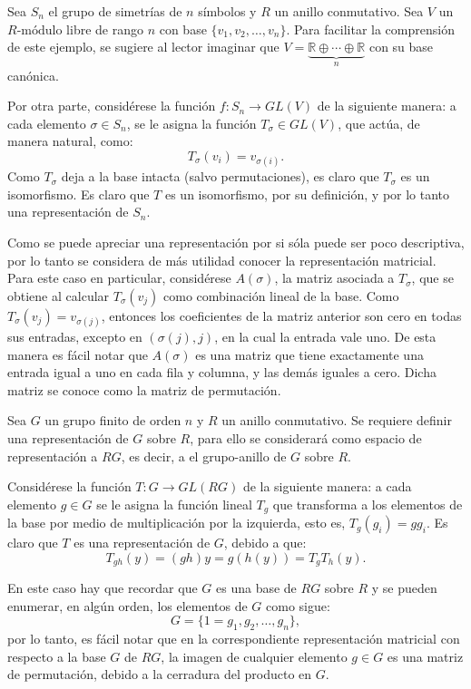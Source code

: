 \begin{ejemplo}
Sea $S_n$ el grupo de simetrías de $n$ símbolos y $R$ un anillo conmutativo. Sea $V$ un $R\mbox{-módulo}$ libre de rango $n$ con base $\{v_1, v_2, \dots, v_n\}$. Para facilitar la comprensión de este ejemplo, se sugiere al lector imaginar que $V = \underset{n}{\underbrace{\mathds{R} \oplus \cdots \oplus \mathds{R}}}$ con su base canónica. 

Por otra parte, considérese la función $f \colon S_n \to GL(V)$ de la siguiente manera: a cada elemento $\sigma 
\in S_n$, se le asigna la función $T_{\sigma} \in GL(V)$, que actúa, de manera natural, como:
\[T_{\sigma}(v_i) = v_{\sigma(i)}.\]
\indent Como $T_{\sigma}$ deja a la base intacta (salvo permutaciones), es claro que $T_\sigma$ es un isomorfismo. Es claro que $T$ es un isomorfismo, por su definición, y por lo tanto una representación de $S_n$.

Como se puede apreciar una representación por si sóla puede ser poco descriptiva, por lo tanto se considera de más utilidad conocer la representación matricial. Para este caso en particular, considérese $A(\sigma)$, la matriz asociada a $T_{\sigma}$, que se obtiene al calcular $T_{\sigma}(v_j)$ como combinación lineal de la base. Como $T_{\sigma} (v_j) = v_{\sigma(j)}$, entonces los coeficientes de la matriz anterior son cero en todas sus entradas, excepto en $(\sigma(j),j)$, en la cual la entrada vale uno. De esta manera es fácil notar que $A(\sigma)$ es una matriz que tiene exactamente una entrada igual a uno en cada fila y columna, y las demás iguales a cero. Dicha matriz se conoce como la matriz de permutación.
\end{ejemplo}
\begin{ejemplo}
Sea $G$ un grupo finito de orden $n$ y $R$ un anillo conmutativo. Se requiere definir una representación de $G$ sobre $R$, para ello se considerará  como espacio de representación a $RG$, es decir, a el grupo-anillo de $G$ sobre $R$. 

Considérese la función $T \colon G \to GL(RG)$ de la siguiente manera: a cada elemento $g \in G$ se le asigna la función lineal $T_g$ que transforma a los elementos de la base por medio de multiplicación por la izquierda, esto es, $T_g(g_i) = gg_i$. Es claro que $T$ es una representación de $G$, debido a que:
\begin{equation*} T_{gh}(y) = (gh)y = g(h(y)) = T_gT_h(y).  \end{equation*}

 
En este caso hay que recordar que $G$ es una base de $RG$ sobre $R$ y se pueden enumerar, en algún orden, los elementos de $G$ como sigue:
\begin{equation*} 
G = \{ 1=g_1, g_2, \dots, g_n \}, 
\end{equation*}  por lo tanto, es fácil notar que en la correspondiente representación matricial con respecto a la base $G$ de $RG$, la imagen de cualquier elemento $g \in G$ es una matriz de permutación, debido a la cerradura del producto en $G$. 
\end{ejemplo}
